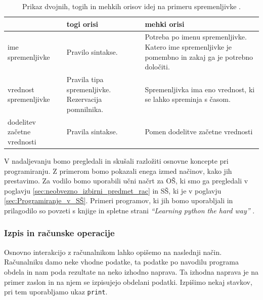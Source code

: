 \begin{table}[!h]

\caption{Prikaz dvojnih, togih in mehkih orisov idej na primeru
  spremenljivke \cite{guideTCS}. }
\label{tab:koncept_spremenljivka}
\begin{tabular}{
  | p{} |
  p{} |
  p{} | }
  \hline
  \rowcolor{sbase01!100}
  & \textbf{togi orisi} & \textbf{mehki orisi}\\
  \hline
  ime spremenljivke & Pravilo sintakse. & Potreba po imenu
                                          spremenljivke. Katero ime
                                          spremenljivke je pomembno in
                                          zakaj ga je potrebno
                                          določiti.\\
  \hline
  vrednost spremenljivke & Pravila tipa spremenljivke. Rezervacija
                           pomnilnika. & Spremenljivka ima eno
                                         vrednost, ki se lahko
                                         spreminja s časom.\\
  \hline
  dodelitev začetne vrednosti & Pravila sintakse. & Pomen dodelitve
                                                  začetne vrednosti\\
  \hline

\end{tabular}
\end{table}

V nadaljevanju bomo pregledali in skušali razložiti osnovne koncepte
pri programiranju. Z primerom bomo pokazali enega izmed načinov, kako
jih prestavimo. Za vodilo bomo uporabili učni načrt za OŠ, ki smo ga
pregledali v poglavju \ref{sec:neobvezno_izbirni_predmet_rac} in SŠ,
ki je v poglavju \ref{sec:Programiranje_v_SŠ}. Primeri programov, ki
jih bomo uporabljali in prilagodilo so povzeti s knjige in spletne
strani \emph{``Learning python the hard way''} \cite{web:PTHardWay}.


\subsubsection{Izpis in računske operacije}
\label{sec:izpis_rac_operacije}

Osnovno interakcijo z računalnikom lahko opišemo na naslednji
način. Računalniku damo neke vhodne podatke, ta podatke po navodilu
programa obdela in nam poda rezultate na neko izhodno naprava. Ta
izhodna naprava je na primer zaslon in na njem se izpisujejo obdelani
podatki. Izpišimo nekaj stavkov, pri tem uporabljamo ukaz
\texttt{print}.

